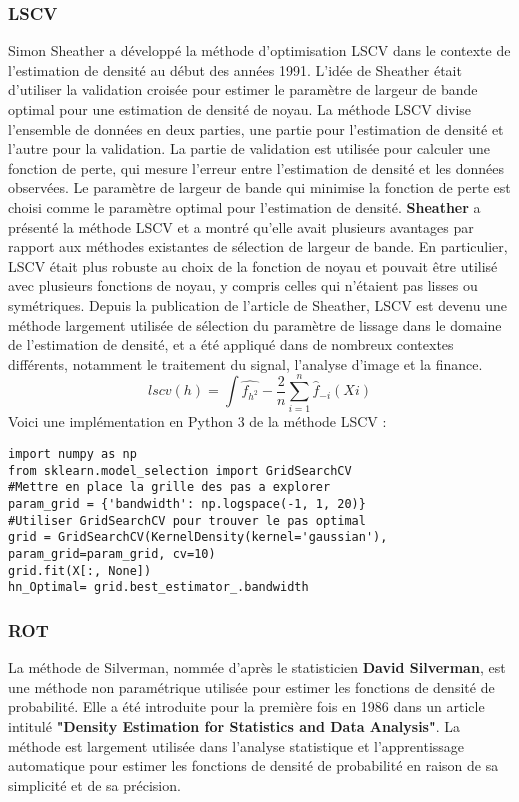 \subsubsection{LSCV}
Simon Sheather a développé la méthode d'optimisation LSCV dans le contexte de l'estimation de densité au début des années 1991. L'idée de Sheather était d'utiliser la validation croisée pour estimer le paramètre de largeur de bande optimal pour une estimation de densité de noyau. La méthode LSCV divise l'ensemble de données en deux parties, une partie pour l'estimation de densité et l'autre pour la validation. La partie de validation est utilisée pour calculer une fonction de perte, qui mesure l'erreur entre l'estimation de densité et les données observées. Le paramètre de largeur de bande qui minimise la fonction de perte est choisi comme le paramètre optimal pour l'estimation de densité.
\newline
\textbf{Sheather} a présenté la méthode LSCV et a montré qu'elle avait plusieurs avantages par rapport aux méthodes existantes de sélection de largeur de bande. En particulier, LSCV était plus robuste au choix de la fonction de noyau et pouvait être utilisé avec plusieurs fonctions de noyau, y compris celles qui n'étaient pas lisses ou symétriques.
Depuis la publication de l'article de Sheather, LSCV est devenu une méthode largement utilisée de sélection du paramètre de lissage dans le domaine de l'estimation de densité, et a été appliqué dans de nombreux contextes différents, notamment le traitement du signal, l'analyse d'image et la finance.
\begin{equation}
lscv(h)=\int \hat{f_{h^2}} - \frac{2}{n} {\sum_{i=1}^{n}{\hat f}_{-i}}(Xi)
\end{equation}
Voici une implémentation en Python 3 de la méthode LSCV : 
\begin{lstlisting}
import numpy as np
from sklearn.model_selection import GridSearchCV
#Mettre en place la grille des pas a explorer
param_grid = {'bandwidth': np.logspace(-1, 1, 20)}
#Utiliser GridSearchCV pour trouver le pas optimal
grid = GridSearchCV(KernelDensity(kernel='gaussian'), param_grid=param_grid, cv=10)
grid.fit(X[:, None])
hn_Optimal= grid.best_estimator_.bandwidth
\end{lstlisting}

\subsubsection{ROT}
La méthode de Silverman, nommée d'après le statisticien \textbf{David Silverman}, est une méthode non paramétrique utilisée pour estimer les fonctions de densité de probabilité. Elle a été introduite pour la première fois en 1986 dans un article intitulé \textbf{"Density Estimation for Statistics and Data Analysis"}. La méthode est largement utilisée dans l'analyse statistique et l'apprentissage automatique pour estimer les fonctions de densité de probabilité en raison de sa simplicité et de sa précision.

